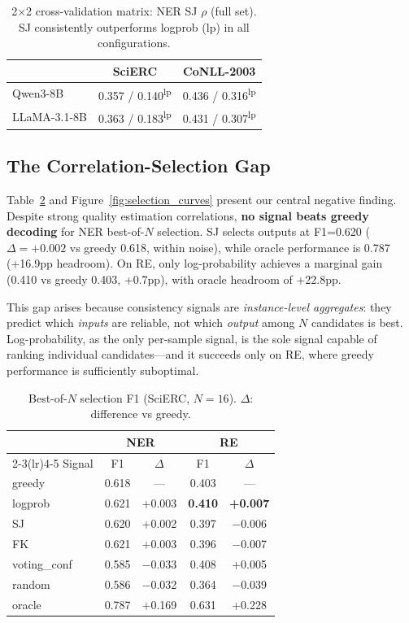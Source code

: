 \documentclass[11pt,a4paper]{article}
\begin{document}
\begin{table}[t]
\centering
\small
\caption{2$\times$2 cross-validation matrix: NER SJ $\rho$ (full set). SJ consistently outperforms logprob (lp) in all configurations.}
\label{tab:matrix}
\begin{tabular}{l cc}
\toprule
& SciERC & CoNLL-2003 \\
\midrule
Qwen3-8B & 0.357 / 0.140\textsuperscript{lp} & 0.436 / 0.316\textsuperscript{lp} \\
LLaMA-3.1-8B & 0.363 / 0.183\textsuperscript{lp} & 0.431 / 0.307\textsuperscript{lp} \\
\bottomrule
\end{tabular}
\end{table}

\subsection{The Correlation-Selection Gap}
\label{sec:gap}

Table~\ref{tab:selection} and Figure~\ref{fig:selection_curves} present our central negative finding.
Despite strong quality estimation correlations, \textbf{no signal beats greedy decoding} for NER best-of-$N$ selection.
SJ selects outputs at F1=0.620 ($\Delta{=}+0.002$ vs greedy 0.618, within noise), while oracle performance is 0.787 (+16.9pp headroom).
On RE, only log-probability achieves a marginal gain (0.410 vs greedy 0.403, +0.7pp), with oracle headroom of +22.8pp.

This gap arises because consistency signals are \emph{instance-level aggregates}: they predict which \emph{inputs} are reliable, not which \emph{output} among $N$ candidates is best.
Log-probability, as the only per-sample signal, is the sole signal capable of ranking individual candidates---and it succeeds only on RE, where greedy performance is sufficiently suboptimal.

\begin{table}[t]
\centering
\small
\caption{Best-of-$N$ selection F1 (SciERC, $N{=}16$). $\Delta$: difference vs greedy.}
\label{tab:selection}
\begin{tabular}{l cc cc}
\toprule
& \multicolumn{2}{c}{\textbf{NER}} & \multicolumn{2}{c}{\textbf{RE}} \\
\cmidrule(lr){2-3}\cmidrule(lr){4-5}
Signal & F1 & $\Delta$ & F1 & $\Delta$ \\
\midrule
greedy       & 0.618 & --- & 0.403 & --- \\
logprob      & 0.621 & +0.003 & \textbf{0.410} & \textbf{+0.007} \\
SJ           & 0.620 & +0.002 & 0.397 & $-$0.006 \\
FK           & 0.621 & +0.003 & 0.396 & $-$0.007 \\
voting\_conf & 0.585 & $-$0.033 & 0.408 & +0.005 \\
random       & 0.586 & $-$0.032 & 0.364 & $-$0.039 \\
\midrule
oracle       & 0.787 & +0.169 & 0.631 & +0.228 \\
\bottomrule
\end{tabular}
\end{table}
\end{document}
